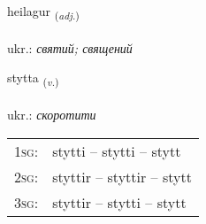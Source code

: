 \documentclass[frontgrid, backgrid]{flacards}\usepackage[]{graphicx}\usepackage[]{xcolor}
\begin{document}
\renewcommand{\flhead}{\vskip5pt \fboxsep=0pt {\small\bfseries\footnotesize Lýsingarorð | прикметник}}
\renewcommand{\fcfoot}{\vskip5pt \fboxsep=0pt \hspace{2pt}{\small\bfseries\footnotesize 2K}}

\renewcommand{\blhead}{\vskip5pt {\small\bfseries\footnotesize Lýsingarorð | прикметник }}
\renewcommand{\bcfoot}{\vskip5pt \hspace{2pt}{\small\bfseries\footnotesize 2K}}


{heilagur \small{\textsubscript{(\textit{adj.})}} \\[1ex] %
\textphonetic{[heiːlaɣʏr]} \\
ukr.: \emph{святий; священий} \\  [2ex]
\renewcommand*{\arraystretch}{0.8}
}

\renewcommand{\flhead}{\vskip5pt \fboxsep=0pt {\small\bfseries\footnotesize Sagnorð | дієслово}}
\renewcommand{\fcfoot}{\vskip5pt \fboxsep=0pt \hspace{2pt}{\small\bfseries\footnotesize 2K}}

\renewcommand{\blhead}{\vskip5pt {\small\bfseries\footnotesize Sagnorð | дієслово }}
\renewcommand{\bcfoot}{\vskip5pt \hspace{2pt}{\small\bfseries\footnotesize 2K}}


{stytta \small{\textsubscript{(\textit{v.})}} \\[1ex] %
\textphonetic{[stɪhta]} \\
ukr.: \emph{скоротити} \\  [2ex]
\renewcommand*{\arraystretch}{0.8}
\begin{tabular}{p{1cm}l}
\textsc{1sg}: & stytti -- stytti -- stytt \\ 
\textsc{2sg}: & styttir -- styttir -- stytt \\ 
\textsc{3sg}: & styttir -- stytti -- stytt \\ 
\end{tabular}
}
\end{document}
